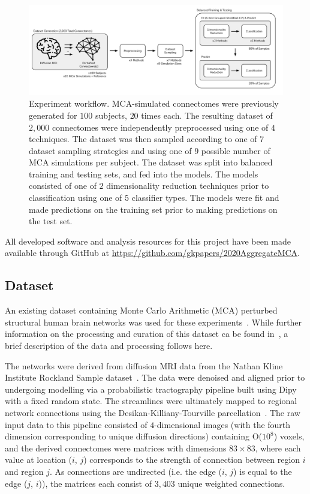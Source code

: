 \documentclass[10pt]{SelfArx} %
\newcommand{\new}[1]{\color{blue}#1\color{black}}
\begin{document}
\begin{figure}[bth!]\centering
\includegraphics[width=\linewidth]{figures/0.pdf}
\caption{Experiment workflow. MCA-simulated connectomes were previously generated for $100$ subjects, $20$ times each.
The resulting dataset of $2,000$ connectomes were independently preprocessed using one of $4$ techniques. The dataset
was then sampled according to one of $7$ dataset sampling strategies and using one of $9$ possible number of MCA
simulations per subject. The dataset was split into balanced training and testing sets, and fed into the models. The
models consisted of one of $2$ dimensionality reduction techniques prior to classification using one of $5$ classifier
types. The models were fit and made predictions on the training set prior to making predictions on the test set.}
\label{fig:workflow}
\end{figure}

All developed software and analysis resources for this project have been made available through GitHub at
\url{https://github.com/gkpapers/2020AggregateMCA}.

\subsection*{Dataset}

An existing dataset containing Monte Carlo Arithmetic (MCA) perturbed structural human brain networks was used for
these experiments~\cite{Kiar2020-yz}. \new{While further information on the processing and curation of this dataset ca
be found in~\cite{Kiar2020-kz}, a brief description of the data and processing follows here.}

\new{The networks were derived from diffusion MRI data from the Nathan Kline Institute Rockland Sample
dataset~\cite{zuo2014open}. The data were denoised and aligned prior to undergoing modelling via a probabilistic
tractography pipeline built using Dipy~\cite{Garyfallidis2014-ql} with a fixed random state. The streamlines were
ultimately mapped to regional network connections using the Desikan-Killiany-Tourville
parcellation~\cite{Klein2012-vi}. The raw input data to this pipeline consisted of $4$-dimensional images (with the 
fourth dimension corresponding to unique diffusion directions) containing O($10^8$) voxels, and the derived
connectomes were matrices with dimensions $83 \times 83$, where each value at location ($i$, $j$) corresponds to the
strength of connection between region $i$ and region $j$. As connections are undirected (i.e. the edge ($i$, $j$) is
equal to the edge ($j$, $i$)), the matrices each consist of $3,403$ unique weighted connections.}
\end{document}
